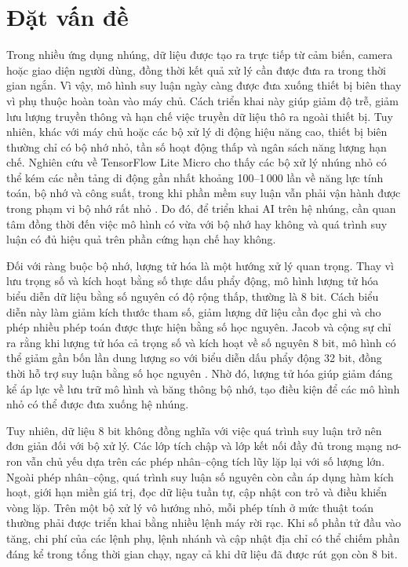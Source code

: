 \documentclass[../DoAn.tex]{subfiles}
\begin{document}
\section{Đặt vấn đề}
\label{sec:dvd}

Trong nhiều ứng dụng nhúng, dữ liệu được tạo ra trực tiếp từ cảm biến, camera hoặc giao diện người dùng, đồng thời kết quả xử lý cần được đưa ra trong thời gian ngắn. Vì vậy, mô hình suy luận ngày càng được đưa xuống thiết bị biên thay vì phụ thuộc hoàn toàn vào máy chủ. Cách triển khai này giúp giảm độ trễ, giảm lưu lượng truyền thông và hạn chế việc truyền dữ liệu thô ra ngoài thiết bị. Tuy nhiên, khác với máy chủ hoặc các bộ xử lý di động hiệu năng cao, thiết bị biên thường chỉ có bộ nhớ nhỏ, tần số hoạt động thấp và ngân sách năng lượng hạn chế. Nghiên cứu về TensorFlow Lite Micro cho thấy các bộ xử lý nhúng nhỏ có thể kém các nền tảng di động gần nhất khoảng 100--1\,000 lần về năng lực tính toán, bộ nhớ và công suất, trong khi phần mềm suy luận vẫn phải vận hành được trong phạm vi bộ nhớ rất nhỏ \cite{david2021tflm}. Do đó, để triển khai AI trên hệ nhúng, cần quan tâm đồng thời đến việc mô hình có vừa với bộ nhớ hay không và quá trình suy luận có đủ hiệu quả trên phần cứng hạn chế hay không.

Đối với ràng buộc bộ nhớ, lượng tử hóa là một hướng xử lý quan trọng. Thay vì lưu trọng số và kích hoạt bằng số thực dấu phẩy động, mô hình lượng tử hóa biểu diễn dữ liệu bằng số nguyên có độ rộng thấp, thường là 8 bit. Cách biểu diễn này làm giảm kích thước tham số, giảm lượng dữ liệu cần đọc ghi và cho phép nhiều phép toán được thực hiện bằng số học nguyên. Jacob và cộng sự chỉ ra rằng khi lượng tử hóa cả trọng số và kích hoạt về số nguyên 8 bit, mô hình có thể giảm gần bốn lần dung lượng so với biểu diễn dấu phẩy động 32 bit, đồng thời hỗ trợ suy luận bằng số học nguyên \cite{jacob2018integer}. Nhờ đó, lượng tử hóa giúp giảm đáng kể áp lực về lưu trữ mô hình và băng thông bộ nhớ, tạo điều kiện để các mô hình nhỏ có thể được đưa xuống hệ nhúng.

Tuy nhiên, dữ liệu 8 bit không đồng nghĩa với việc quá trình suy luận trở nên đơn giản đối với bộ xử lý. Các lớp tích chập và lớp kết nối đầy đủ trong mạng nơ-ron vẫn chủ yếu dựa trên các phép nhân--cộng tích lũy lặp lại với số lượng lớn. Ngoài phép nhân--cộng, quá trình suy luận số nguyên còn cần áp dụng hàm kích hoạt, giới hạn miền giá trị, đọc dữ liệu tuần tự, cập nhật con trỏ và điều khiển vòng lặp. Trên một bộ xử lý vô hướng nhỏ, mỗi phép tính ở mức thuật toán thường phải được triển khai bằng nhiều lệnh máy rời rạc. Khi số phần tử đầu vào tăng, chi phí của các lệnh phụ, lệnh nhánh và cập nhật địa chỉ có thể chiếm phần đáng kể trong tổng thời gian chạy, ngay cả khi dữ liệu đã được rút gọn còn 8 bit.
\end{document}
